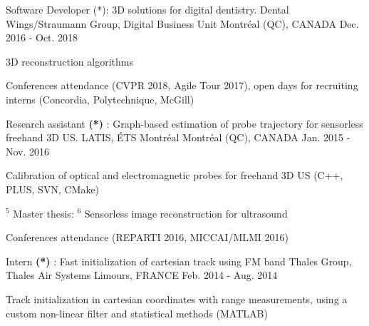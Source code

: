 \begin{cventries}
\cventry
{Software Developer (*): 3D solutions for digital dentistry.}%
{Dental Wings/Straumann Group, Digital Business Unit} %
{\hspace{-5mm}Montréal (QC), CANADA} %
{Dec. 2016 - Oct. 2018} %
{ %
\begin{cvitems}
\item {3D reconstruction algorithms}
\item {Conferences attendance (CVPR 2018, Agile Tour 2017), open days for recruiting interns (Concordia, Polytechnique, McGill)}
\end{cvitems}
}


\cventry
{Research assistant \textbf{(*)} : Graph-based estimation of probe trajectory for sensorless freehand 3D US.}%
{LATIS, ÉTS Montréal} %
{\hspace{-5mm}Montréal (QC), CANADA} %
{Jan. 2015 - Nov. 2016} %
{ %
\begin{cvitems}
\item {Calibration of optical and electromagnetic probes for freehand 3D US (C++, PLUS, SVN, CMake)}
\item {\hyperref[award:5]{$^5$} Master thesis: \hyperref[award:6]{$^6$} Sensorless image reconstruction for ultrasound}
\item {Conferences attendance (REPARTI 2016, MICCAI/MLMI 2016)}
\end{cvitems}
}


\cventry
{Intern \textbf{(*)} : Fast initialization of cartesian track using FM band} %
{Thales Group, Thales Air Systems} %
{Limours, FRANCE} %
{Feb. 2014 - Aug. 2014} %
{ %
\begin{cvitems}
\item {Track initialization in cartesian coordinates with range measurements, using a custom non-linear filter and statistical methods (MATLAB)}
\end{cvitems}
}
\end{cventries}
